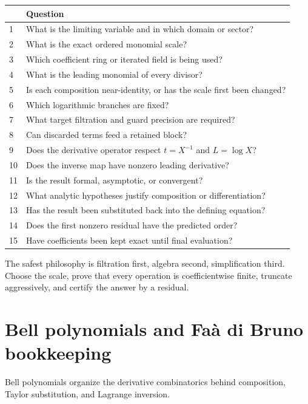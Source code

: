 \documentclass[11pt,oneside]{book}
\theoremstyle{definition}
\theoremstyle{remark}
\begin{document}
\begin{longtable}{@{}p{}p{}@{}}
\toprule
&Question\\
\midrule
1&What is the limiting variable and in which domain or sector?\\
2&What is the exact ordered monomial scale?\\
3&Which coefficient ring or iterated field is being used?\\
4&What is the leading monomial of every divisor?\\
5&Is each composition near-identity, or has the scale first been changed?\\
6&Which logarithmic branches are fixed?\\
7&What target filtration and guard precision are required?\\
8&Can discarded terms feed a retained block?\\
9&Does the derivative operator respect $t=X^{-1}$ and $L=\log X$?\\
10&Does the inverse map have nonzero leading derivative?\\
11&Is the result formal, asymptotic, or convergent?\\
12&What analytic hypotheses justify composition or differentiation?\\
13&Has the result been substituted back into the defining equation?\\
14&Does the first nonzero residual have the predicted order?\\
15&Have coefficients been kept exact until final evaluation?\\
\bottomrule
\end{longtable}

\begin{summarybox}
The safest philosophy is filtration first, algebra second, simplification
third. Choose the scale, prove that every operation is coefficientwise
finite, truncate aggressively, and certify the answer by a residual.
\end{summarybox}


\appendix

\chapter{Bell polynomials and Fa\`a di Bruno bookkeeping}
\label{app:bell}

Bell polynomials organize the derivative combinatorics behind composition,
Taylor substitution, and Lagrange inversion.
\end{document}
